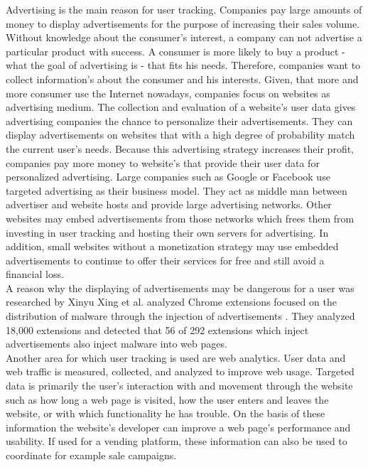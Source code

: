 	Advertising is the main reason for user tracking. Companies pay large amounts of money to display advertisements for the purpose of increasing their sales volume. Without knowledge about the consumer's interest, a company can not advertise a particular product with success. A consumer is more likely to buy a product - what the goal of advertising is - that fits his needs. Therefore, companies want to collect information's about the consumer and his interests. Given, that more and more consumer use the Internet nowadays, companies focus on websites as advertising medium. The collection and evaluation of a website's user data gives advertising companies the chance to personalize their advertisements. They can display advertisements on websites that with a high degree of probability match the current user's needs. Because this advertising strategy increases their profit, companies pay more money to website's that provide their user data for personalized advertising. Large companies such as Google or Facebook use targeted advertising as their business model. They act as middle man between advertiser and website hosts and provide large advertising networks. Other websites may embed advertisements from those networks which frees them from investing in user tracking and hosting their own servers for advertising. In addition, small websites without a monetization strategy may use embedded advertisements to continue to offer their services for free and still avoid a financial loss. \\
	
	A reason why the displaying of advertisements may be dangerous for a user was researched by Xinyu Xing et al. analyzed Chrome extensions focused on the distribution of malware through the injection of advertisements \cite{Xing:2015:UMT:2736277.2741630}. They analyzed 18,000 extensions and detected that 56 of 292 extensions which inject advertisements also inject malware into web pages. %
	\\
	
	Another area for which user tracking is used are web analytics. User data and web traffic is measured, collected, and analyzed to improve web usage. Targeted data is primarily the user's interaction with and movement through the website such as how long a web page is visited, how the user enters and leaves the website, or with which functionality he has trouble. On the basis of these information the website's developer can improve a web page's performance and usability. If used for a vending platform, these information can also be used to coordinate for example sale campaigns. \\
	
